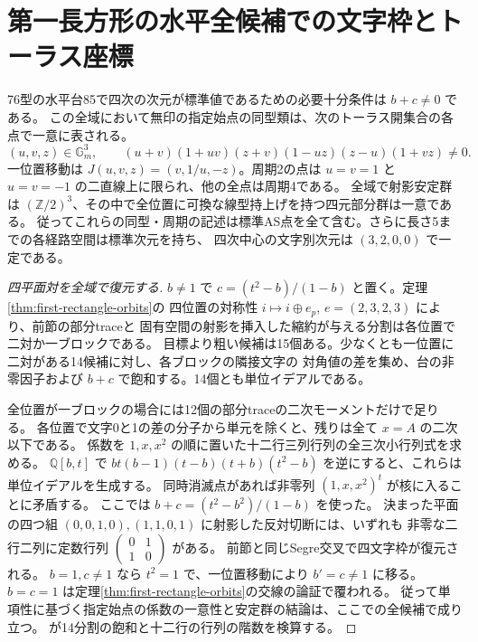 \section{第一長方形の水平全候補での文字枠とトーラス座標}
\label{sec:first-rectangle-horizontal-frames}
\begin{theorem}\label{thm:first-rectangle-horizontal-frames}
76型の水平台85で四次の次元が標準値であるための必要十分条件は $b+c\ne0$ である。
この全域において無印の指定始点の同型類は、次のトーラス開集合の各点で一意に表される。
\[
 (u,v,z)\in\mathbb G_m^3,\qquad
 (u+v)(1+uv)(z+v)(1-uz)(z-u)(1+vz)\ne0 .
\]
一位置移動は $J(u,v,z)=(v,1/u,-z)$。周期2の点は $u=v=1$ と $u=v=-1$ の二直線上に限られ、他の全点は周期4である。
全域で射影安定群は $(\mathbb Z/2)^3$、その中で全位置に可換な線型持上げを持つ四元部分群は一意である。
従ってこれらの同型・周期の記述は標準AS点を全て含む。さらに長さ5までの各経路空間は標準次元を持ち、
四次中心の文字別次元は $(3,2,0,0)$ で一定である。
\end{theorem}

\begin{proof}[四平面対を全域で復元する]
$b\ne1$ で $c=(t^2-b)/(1-b)$ と置く。定理\ref{thm:first-rectangle-orbits}の
四位置の対称性 $i\mapsto i\oplus e_p$, $e=(2,3,2,3)$ により、前節の部分traceと
固有空間の射影を挿入した縮約が与える分割は各位置で二対か一ブロックである。
目標より粗い候補は15個ある。少なくとも一位置に二対がある14候補に対し、各ブロックの隣接文字の
対角値の差を集め、台の非零因子および $b+c$ で飽和する。14個とも単位イデアルである。

全位置が一ブロックの場合には12個の部分traceの二次モーメントだけで足りる。
各位置で文字0と1の差の分子から単元を除くと、残りは全て $x=A$ の二次以下である。
係数を $1,x,x^2$ の順に置いた十二行三列行列の全三次小行列式を求める。
$\mathbb Q[b,t]$ で $bt(b-1)(t-b)(t+b)(t^2-b)$ を逆にすると、これらは単位イデアルを生成する。
同時消滅点があれば非零列 $(1,x,x^2)^t$ が核に入ることに矛盾する。
ここでは $b+c=(t^2-b^2)/(1-b)$ を使った。
決まった平面の四つ組 $(0,0,1,0),(1,1,0,1)$ に射影した反対切断には、いずれも
非零な二行二列に定数行列 $\left(\begin{smallmatrix}0&1\\1&0\end{smallmatrix}\right)$ がある。
前節と同じSegre交叉で四文字枠が復元される。
$b=1,c\ne1$ なら $t^2=1$ で、一位置移動により $b'=c\ne1$ に移る。
$b=c=1$ は定理\ref{thm:first-rectangle-orbits}の交線の論証で覆われる。
従って単項性に基づく指定始点の係数の一意性と安定群の結論は、ここでの全候補で成り立つ。
 が14分割の飽和と十二行の行列の階数を検算する。
\end{proof}

